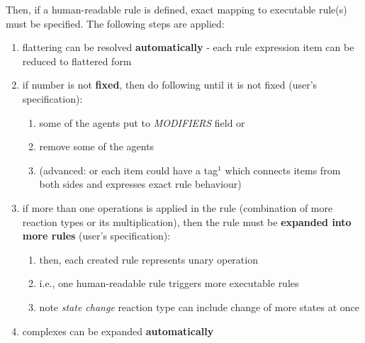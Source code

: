 \documentclass[12pt]{article}
\begin{document}
\vspace*{1cm}
Then, if a human-readable rule is defined, exact mapping to executable rule(s) must be specified. The following steps are applied:

\begin{enumerate}
\item flattering can be resolved \textbf{automatically} - each rule expression item can be reduced to flattered form
\item if number is not \textbf{fixed}, then do following until it is not fixed (user's specification):
	\begin{enumerate}
		\item some of the agents put to \textit{MODIFIERS} field or
		\item remove some of the agents 
		\item (advanced: or each item could have a tag$^1$ which connects items from both sides and expresses exact rule behaviour)
	\end{enumerate}
\item if more than one operations is applied in the rule (combination of more reaction types or its multiplication), then the rule must be \textbf{expanded into more rules} (user's specification):
	\begin{enumerate}
		\item then, each created rule represents unary operation
		\item i.e., one human-readable rule triggers more executable rules
		\item note \textit{state change} reaction type can include change of more states at once
	\end{enumerate}
\item complexes can be expanded \textbf{automatically}
\end{enumerate}
\end{document}
